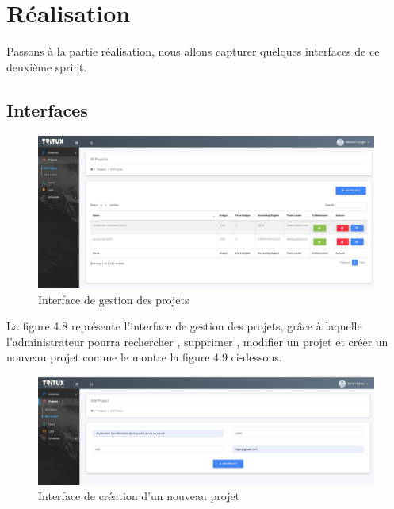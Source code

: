 \section{Réalisation}
Passons à la partie réalisation, nous allons capturer quelques interfaces de ce deuxième 
sprint.
\subsection{Interfaces}
	\begin{figure}[H]
	\centering
	\includegraphics[scale=0.35]{projets.PNG}
	\caption{Interface de gestion des projets}
	\label{Interface de gestion des projets}
\end{figure}

La figure 4.8 représente l'interface de gestion des projets, grâce à laquelle l'administrateur
pourra rechercher , supprimer , modifier un projet et  créer un nouveau projet comme le montre la figure 4.9 ci-dessous. 
	\begin{figure}[H]
	\centering
	\includegraphics[scale=0.35]{addproject.PNG}
	\caption{Interface de création d'un nouveau projet}
	\label{Interface de création d'un nouveau projet}
\end{figure}

